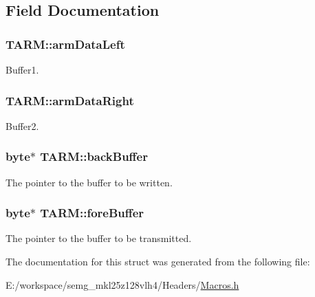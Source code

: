 \subsection{Field Documentation}
\hypertarget{struct_t_a_r_m_a9b9175098c6243daf73d121cfed91cd0}{
\subsubsection[{arm\-Data\-Left}]{ T\-A\-R\-M\-::arm\-Data\-Left}}\label{struct_t_a_r_m_a9b9175098c6243daf73d121cfed91cd0}
Buffer1. \hypertarget{struct_t_a_r_m_aab1bb5b43b99175e5d5e840f2f70173d}{
\subsubsection[{arm\-Data\-Right}]{ T\-A\-R\-M\-::arm\-Data\-Right}}\label{struct_t_a_r_m_aab1bb5b43b99175e5d5e840f2f70173d}
Buffer2. \hypertarget{struct_t_a_r_m_adb38c4a2040af58a4fb2c54a642a8c69}{
\subsubsection[{back\-Buffer}]{\setlength{\rightskip}{0pt plus 5cm}byte$\ast$ T\-A\-R\-M\-::back\-Buffer}}\label{struct_t_a_r_m_adb38c4a2040af58a4fb2c54a642a8c69}
The pointer to the buffer to be written. \hypertarget{struct_t_a_r_m_a2e918fd14799cefe36a3d031b7098cb0}{
\subsubsection[{fore\-Buffer}]{\setlength{\rightskip}{0pt plus 5cm}byte$\ast$ T\-A\-R\-M\-::fore\-Buffer}}\label{struct_t_a_r_m_a2e918fd14799cefe36a3d031b7098cb0}
The pointer to the buffer to be transmitted. 

The documentation for this struct was generated from the following file\-:\begin{DoxyCompactItemize}
\item 
E\-:/workspace/semg\-\_\-mkl25z128vlh4/\-Headers/\hyperlink{_macros_8h}{Macros.\-h}\end{DoxyCompactItemize}
